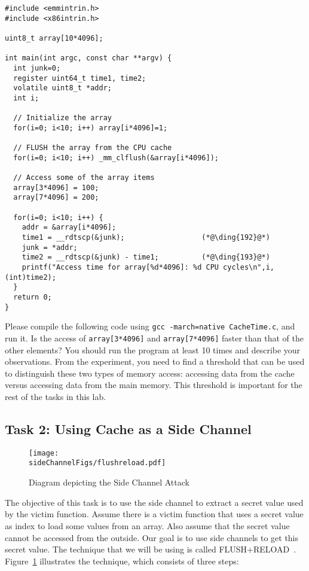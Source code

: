\begin{lstlisting}[caption=\texttt{CacheTime.c}]
#include <emmintrin.h>
#include <x86intrin.h>

uint8_t array[10*4096];

int main(int argc, const char **argv) {
  int junk=0;
  register uint64_t time1, time2;
  volatile uint8_t *addr;
  int i;
  
  // Initialize the array
  for(i=0; i<10; i++) array[i*4096]=1;

  // FLUSH the array from the CPU cache
  for(i=0; i<10; i++) _mm_clflush(&array[i*4096]);

  // Access some of the array items
  array[3*4096] = 100;
  array[7*4096] = 200;

  for(i=0; i<10; i++) {
    addr = &array[i*4096];
    time1 = __rdtscp(&junk);                  (*@\ding{192}@*)
    junk = *addr;
    time2 = __rdtscp(&junk) - time1;          (*@\ding{193}@*)
    printf("Access time for array[%d*4096]: %d CPU cycles\n",i, (int)time2);
  }
  return 0;
}
\end{lstlisting}


Please compile the following code using \texttt{gcc -march=native
CacheTime.c}, and run it.  Is the access of 
\texttt{array[3*4096]} and \texttt{array[7*4096]} faster than
that of the other elements? You should run the program at least 10 times 
and describe your observations. From the experiment,
you need to find a threshold
that can be used to distinguish these two types of memory access: accessing
data from the cache versus accessing data from the main memory.  This
threshold is important for the rest of the tasks in this lab.


\subsection{Task 2: Using Cache as a Side Channel}


\begin{figure}[htb]
\centering
\texttt{[image: \\sideChannelFigs/flushreload.pdf]}
\caption{Diagram depicting the Side Channel Attack}
\label{sidechannel:fig:flushreload}
\end{figure}


The objective of this task is to use the side channel to extract a secret value used by the
victim function. Assume there is a victim  function that uses a secret value as index
to load some values from an array. Also assume that the secret value cannot be accessed from
the outside. Our goal is to use side channels to
get this secret value. The technique that we will be using is called 
FLUSH+RELOAD~\cite{Yarom2014}. Figure~\ref{sidechannel:fig:flushreload} illustrates the 
technique, which consists of three steps: 

